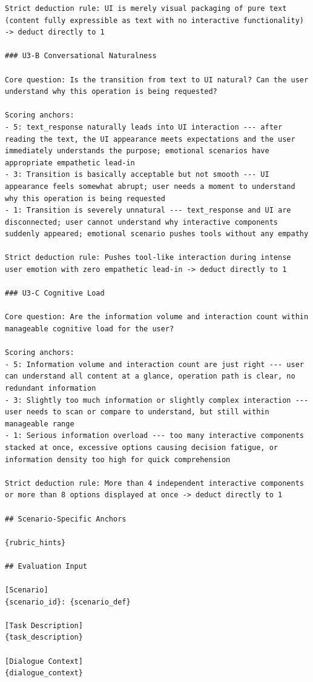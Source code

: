 \documentclass{llmxive}
\begin{document}
\begin{verbatim}
Strict deduction rule: UI is merely visual packaging of pure text (content fully expressible as text with no interactive functionality) -> deduct directly to 1

### U3-B Conversational Naturalness

Core question: Is the transition from text to UI natural? Can the user understand why this operation is being requested?

Scoring anchors:
- 5: text_response naturally leads into UI interaction --- after reading the text, the UI appearance meets expectations and the user immediately understands the purpose; emotional scenarios have appropriate empathetic lead-in
- 3: Transition is basically acceptable but not smooth --- UI appearance feels somewhat abrupt; user needs a moment to understand why this operation is being requested
- 1: Transition is severely unnatural --- text_response and UI are disconnected; user cannot understand why interactive components suddenly appeared; emotional scenario pushes tools without any empathy

Strict deduction rule: Pushes tool-like interaction during intense user emotion with zero empathetic lead-in -> deduct directly to 1

### U3-C Cognitive Load

Core question: Are the information volume and interaction count within manageable cognitive load for the user?

Scoring anchors:
- 5: Information volume and interaction count are just right --- user can understand all content at a glance, operation path is clear, no redundant information
- 3: Slightly too much information or slightly complex interaction --- user needs to scan or compare to understand, but still within manageable range
- 1: Serious information overload --- too many interactive components stacked at once, excessive options causing decision fatigue, or information density too high for quick comprehension

Strict deduction rule: More than 4 independent interactive components or more than 8 options displayed at once -> deduct directly to 1

## Scenario-Specific Anchors

{rubric_hints}

## Evaluation Input

[Scenario]
{scenario_id}: {scenario_def}

[Task Description]
{task_description}

[Dialogue Context]
{dialogue_context}


\end{verbatim}
\end{document}
